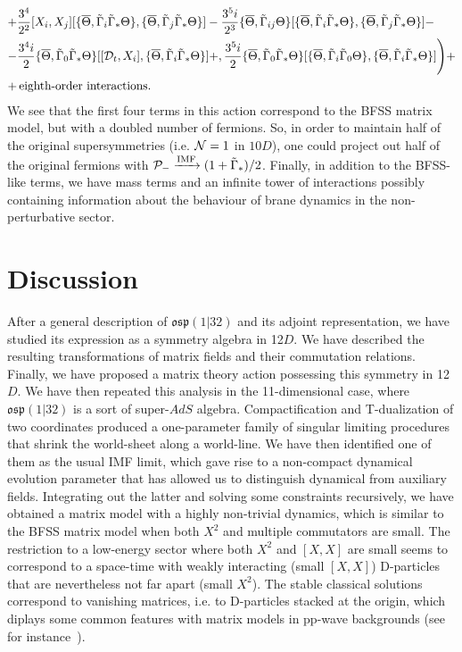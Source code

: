 \documentclass[a4paper,11pt]{article}
\def\G{{\Gamma}}
\begin{document}
\begin{align*}
+& \frac{3^4}{2^2}[X_i,X_j]
[\{\overline{\Theta},\tilde{\G}_i \tilde{\G}_* \Theta\},\{\overline{\Theta},\tilde{\G}_j \tilde{\G}_* \Theta\}] - 
\frac{3^5i}{2^3}\{\overline{\Theta},\tilde{\G}_{ij} \Theta\}
[\{\overline{\Theta},\tilde{\G}_i \tilde{\G}_* \Theta\},\{\overline{\Theta},\tilde{\G}_j \tilde{\G}_* \Theta\}]-\\
-& \frac{3^4i}{2} \{\overline{\Theta},\tilde{\G}_0 \tilde{\G}_* \Theta\}
[[{\cal D}_t,X_i],\{\overline{\Theta},\tilde{\G}_i \tilde{\G}_* \Theta\}] +,
\frac{3^5i}{2}\{\overline{\Theta},\tilde{\G}_0 \tilde{\G}_* \Theta\}[\{\overline{\Theta},\tilde{\G}_i \tilde{\G}_0 \Theta\},\{\overline{\Theta},\tilde{\G}_i \tilde{\G}_* \Theta\}] \Bigg) + \\
+&\,\text{eighth-order interactions.}
\end{align*}
We see that the first four terms in this action correspond to the BFSS matrix model, but with a doubled
number of fermions. So, in order to maintain half of the original supersymmetries (i.e. ${\cal N}=1$ in $10D$), one could
project out half of the original fermions with ${\cal P}_{-}\xrightarrow{\text{IMF}}(1 + \tilde{\G}_{*})/2$. 
Finally, in addition to the BFSS-like terms, we have mass terms and an infinite tower of interactions possibly containing
information about the behaviour of brane dynamics in the non-perturbative sector.

\section{Discussion}

After a general description of $\mathfrak{osp}(1|32)$ and its adjoint representation, we have studied its expression as
a symmetry algebra in 12$D$. We have described the resulting transformations of matrix fields and their commutation 
relations. Finally, we have proposed a matrix theory action possessing this symmetry in 12$D$. We have then repeated
this analysis in the 11-dimensional case, where $\mathfrak{osp}(1|32)$ is a sort of super-$AdS$ algebra.
Compactification and T-dualization of two coordinates produced a one-parameter family of singular limiting procedures 
that shrink the world-sheet along a world-line. We have then identified one of them as the usual IMF limit, which 
gave rise to a non-compact dynamical evolution parameter that has allowed us to distinguish dynamical from auxiliary
fields. Integrating out the latter and solving some constraints recursively, we have obtained a matrix
model with a highly non-trivial dynamics, which is similar to the BFSS matrix model when both $X^{2}$ and multiple
commutators are small. The restriction to a low-energy sector where both $X^{2}$ and $[X,X]$ are small seems 
to correspond to a space-time with weakly interacting (small $[X,X]$) D-particles that are nevertheless not far apart
(small $X^2$). The stable classical solutions correspond to vanishing matrices, i.e. to D-particles stacked at 
the origin, which diplays some common features with matrix models in pp-wave backgrounds (see for 
instance~\cite{BMN,DSJvR,Bon}).
\end{document}
